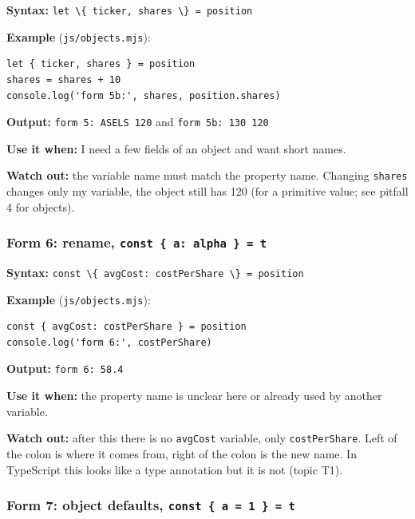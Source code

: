 \documentclass[
  11pt,
]{article}
\newcommand{\passthrough}[1]{#1}
\begin{document}
\textbf{Syntax:}
\passthrough{\lstinline!let \{ ticker, shares \} = position!}

\textbf{Example} (\passthrough{\lstinline!js/objects.mjs!}):

\begin{lstlisting}
let { ticker, shares } = position
shares = shares + 10
console.log('form 5b:', shares, position.shares)
\end{lstlisting}

\textbf{Output:} \passthrough{\lstinline!form 5: ASELS 120!} and
\passthrough{\lstinline!form 5b: 130 120!}

\textbf{Use it when:} I need a few fields of an object and want short
names.

\textbf{Watch out:} the variable name must match the property name.
Changing \passthrough{\lstinline!shares!} changes only my variable, the
object still has 120 (for a primitive value; see pitfall 4 for objects).

\subsubsection{\texorpdfstring{Form 6: rename,
\texttt{const\ \{\ a:\ alpha\ \}\ =\ t}}{Form 6: rename, const \{ a: alpha \} = t}}\label{form-6-rename-const-a-alpha-t}

\textbf{Syntax:}
\passthrough{\lstinline!const \{ avgCost: costPerShare \} = position!}

\textbf{Example} (\passthrough{\lstinline!js/objects.mjs!}):

\begin{lstlisting}
const { avgCost: costPerShare } = position
console.log('form 6:', costPerShare)
\end{lstlisting}

\textbf{Output:} \passthrough{\lstinline!form 6: 58.4!}

\textbf{Use it when:} the property name is unclear here or already used
by another variable.

\textbf{Watch out:} after this there is no
\passthrough{\lstinline!avgCost!} variable, only
\passthrough{\lstinline!costPerShare!}. Left of the colon is where it
comes from, right of the colon is the new name. In TypeScript this looks
like a type annotation but it is not (topic T1).

\subsubsection{\texorpdfstring{Form 7: object defaults,
\texttt{const\ \{\ a\ =\ 1\ \}\ =\ t}}{Form 7: object defaults, const \{ a = 1 \} = t}}\label{form-7-object-defaults-const-a-1-t}
\end{document}
